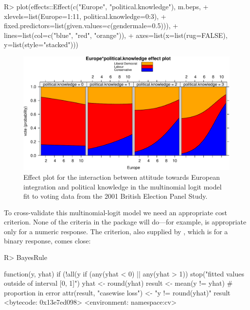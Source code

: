 \documentclass[
]{jss}
\begin{document}
\begin{CodeChunk}
\begin{CodeInput}
R> plot(effects::Effect(c("Europe", "political.knowledge"), m.beps,
+             xlevels=list(Europe=1:11, political.knowledge=0:3),
+             fixed.predictors=list(given.values=c(gendermale=0.5))),
+      lines=list(col=c("blue", "red", "orange")),
+      axes=list(x=list(rug=FALSE), y=list(style="stacked")))
\end{CodeInput}
\begin{figure}

{\centering \includegraphics{JSS-article-reduced_files/figure-latex/BEPS-plot-1} 

}

\caption[Effect plot for the interaction between attitude towards European integration and political knowledge in the multinomial logit model fit to voting data from the 2001 British Election Panel Study]{Effect plot for the interaction between attitude towards European integration and political knowledge in the multinomial logit model fit to voting data from the 2001 British Election Panel Study.}\label{fig:BEPS-plot}
\end{figure}
\end{CodeChunk}

To cross-validate this multinomial-logit model we need an appropriate
cost criterion. None of the criteria in the  package will
do---for example,  is appropriate only for a numeric
response. The  criterion, also supplied by ,
which is for a binary response, comes close:

\begin{CodeChunk}
\begin{CodeInput}
R> BayesRule
\end{CodeInput}
\begin{CodeOutput}
function(y, yhat){
  if (!all(y %
  if (any(yhat < 0) || any(yhat > 1)) stop("fitted values outside of interval [0, 1]")
  yhat <- round(yhat)
  result <- mean(y != yhat) # proportion in error
  attr(result, "casewise loss") <- "y != round(yhat)"
  result
}
<bytecode: 0x13e7ed098>
<environment: namespace:cv>
\end{CodeOutput}
\end{CodeChunk}
\end{document}
